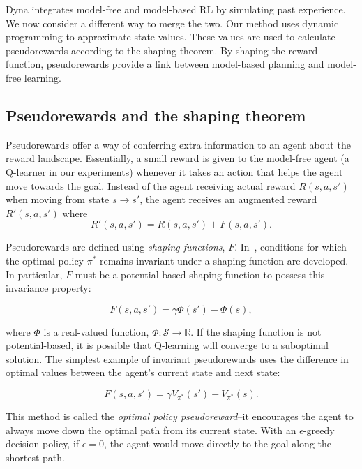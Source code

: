 \documentclass[letterpaper]{article}
\begin{document}
Dyna integrates model-free and model-based RL by simulating past experience. We now consider a different way to merge the two. Our method uses dynamic programming to approximate state values. These values are used to calculate pseudorewards according to the shaping theorem. By shaping the reward function, pseudorewards provide a link between model-based planning and model-free learning.

\subsection{Pseudorewards and the shaping theorem}

Pseudorewards offer a way of conferring extra information to an agent about the reward landscape. Essentially, a small reward is given to the model-free agent (a Q-learner in our experiments) whenever it takes an action that helps the agent move towards the goal. Instead of the agent receiving actual reward $R(s,a,s')$ when moving from state $s \rightarrow s'$, the agent receives an augmented reward $R'(s,a,s')$ where
\begin{equation}
R'(s,a,s') = R(s,a,s') + F(s,a,s').
\end{equation} 

Pseudorewards are defined using \textit{shaping functions}, $F$. In~\cite{ng1999policy}, conditions for which the optimal policy $\pi^*$ remains invariant under a shaping function are developed. In particular, $F$ must be a potential-based shaping function to possess this invariance property:

\begin{equation}
F(s,a,s') = \gamma \Phi(s') - \Phi(s) ,
\end{equation}

\noindent
where $\Phi$ is a real-valued function, $\Phi : \mathcal{S} \rightarrow \mathbb{R}$. If the shaping function is not potential-based, it is possible that Q-learning will converge to a suboptimal solution. The simplest example of invariant pseudorewards uses the difference in optimal values between the agent's current state and next state:

\begin{equation}
F(s,a,s') = \gamma V_{\pi^*}(s') - V_{\pi^*}(s) .
\end{equation}

This method is called the \textit{optimal policy pseudoreward}--it encourages the agent to always move down the optimal path from its current state. With an $\epsilon$-greedy decision policy, if $\epsilon = 0$, the agent would move directly to the goal along the shortest path.
\end{document}
